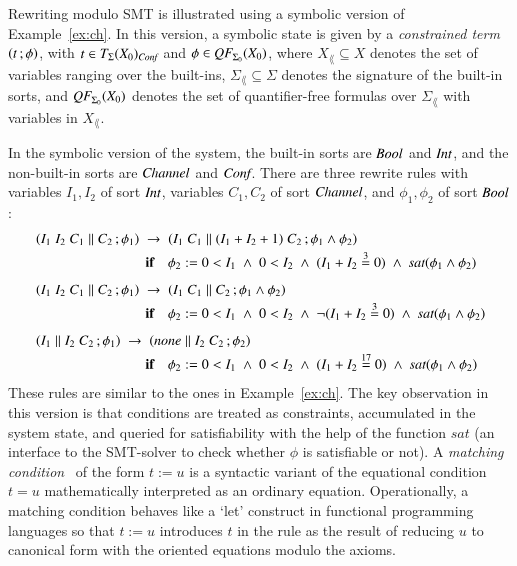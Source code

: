 Rewriting modulo SMT is illustrated using 
a symbolic version of %
Example~\ref{ex:ch}.
In this version, 
a symbolic state is given by a
\emph{constrained term} $\left( t \,; \phi \right)$, with $t \in
T_\Sigma(X_{0})_{\textit{Conf}}$ and $\phi \in
\textit{\textit{QF}}_{\Sigma_{0}}({X_{0}})$,
 where $X_\lang \subseteq X$ denotes the
set of variables ranging over the built-ins, 
$\Sigma_\lang \subseteq
\Sigma$ denotes the signature of the built-in sorts, 
and
$\textit{\textit{QF}}_{\Sigma_{0}}({X_{0}})$ denotes the set of quantifier-free formulas
over $\Sigma_\lang$ with variables in $X_\lang$. 

\begin{example}
In the symbolic version of the system,
the built-in sorts are
$\textit{Bool}$ and $\textit{Int}$, and the non-built-in sorts are
$\textit{Channel}$ and $\textit{Conf}$. 
%
There are
three %
rewrite rules
with  variables
$I_1,I_2$ of sort $\textit{Int}$, 
variables $C_1,C_2$ of sort $\textit{Channel}$, and
$\phi_1,\phi_2$ of sort $\textit{Bool}$:
%
\begin{align*}
  &\left( I_1\;I_2\;C_1 \parallel C_2 \,; \phi_1 \right) \;\rightarrow\;\left( I_1 \; C_1 \parallel (I_1 + I_2 + 1)\;C_2 \,; \phi_1 \land \phi_2 \right) 
  \\[-0.2em]
  &\qquad\qquad\qquad\qquad \textbf{if} \quad \phi_2 := 0 < I_1 \;\land\; 0< I_2 \;\land\; (I_1 + I_2 \stackrel{3}{=} 0) \; \land \; \textit{sat}(\phi_1 \land \phi_2) 
\\[1ex]
  &\left( I_1\;I_2\;C_1 \parallel C_2 \,; \phi_1 \right)\;\rightarrow \;\left( I_1\;C_1 \parallel C_2 \,; \phi_1\land\phi_2 \right) 
  \\[-0.2em]
  &\qquad\qquad\qquad\qquad\textbf{if} \quad \phi_2 := 0 < I_1 \;\land\; 0< I_2 \;\land\; \neg(I_1 + I_2 \stackrel{3}{=} 0) \; \land \; \textit{sat}(\phi_1 \land \phi_2) 
\\[1ex]
  &\left( I_1 \parallel I_2\;C_2 \,; \phi_1 \right)\;\rightarrow\;\left( \textit{none} \parallel I_2 \;C_2 \,; \phi_2 \right) 
  \\[-0.2em]
  &\qquad\qquad\qquad\qquad \textbf{if} \quad  \phi_2 := 0 < I_1 \;\land\; 0< I_2 \;\land\; (I_1 + I_2 \stackrel{17}{=} 0) \; \land\; \textit{sat}(\phi_1 \land \phi_2)
\end{align*}
%
These %
rules are similar to the ones %
in Example~\ref{ex:ch}.
The key observation in this version is that conditions are
treated as constraints, accumulated in the system state, and queried
for satisfiability with the help of the function $\textit{sat}$ (an
interface to the SMT-solver 
to check whether $\phi$ is satisfiable or not).
A
\textit{matching condition}~\cite{clavel-maudebook-2007} of the form
$t := u$ is a syntactic variant of the equational condition $t = u$
mathematically interpreted as an ordinary equation. Operationally, a
matching condition behaves like a `let' construct in functional
programming languages so that $t := u$ introduces $t$ in the rule as
the result of reducing $u$ to canonical form with the oriented
equations modulo the axioms.
\end{example}

